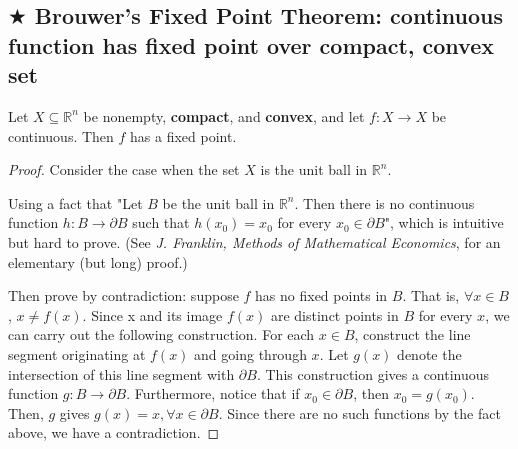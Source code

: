 \documentclass[11pt]{elegantbook}
\begin{document}
\subsection{$\bigstar$ Brouwer's Fixed Point Theorem: continuous function has fixed point over compact, convex set}
\begin{theorem}
    Let $X \subseteq \mathbb{R}^n$ be nonempty, \textbf{compact}, and \textbf{convex}, and let $f : X \rightarrow X$ be continuous. Then $f$ has a fixed point.
\end{theorem}
\begin{proof}
    \normalfont
    Consider the case when the set $X$ is the unit ball in $\mathbb{R}^n$.

    Using a fact that "Let $B$ be the unit ball in $\mathbb{R}^n$. Then there is no continuous function $h : B \rightarrow \partial B$ such that $h(x_0) = x_0$ for every $x_0 \in \partial B$", which is intuitive but hard to prove. (See \textit{J. Franklin, Methods of Mathematical Economics}, for an elementary (but long) proof.)

    Then prove by contradiction: suppose $f$ has no fixed points in $B$. That is, $\forall x\in B$, $x\neq f(x)$. Since x and its image $f(x)$ are distinct points in $B$ for every $x$, we can carry out the following construction. For each $x \in B$, construct the line segment originating at $f(x)$ and going through $x$. Let $g(x)$ denote the intersection of this line segment with $\partial B$. This construction gives a continuous function $g : B \rightarrow \partial B$. Furthermore, notice that if $x_0 \in \partial B$, then $x_0 = g(x_0)$. Then, $g$ gives $g(x)=x,\forall x\in \partial B$. Since there are no such functions by the fact above, we have a contradiction.
\end{proof}
\end{document}
